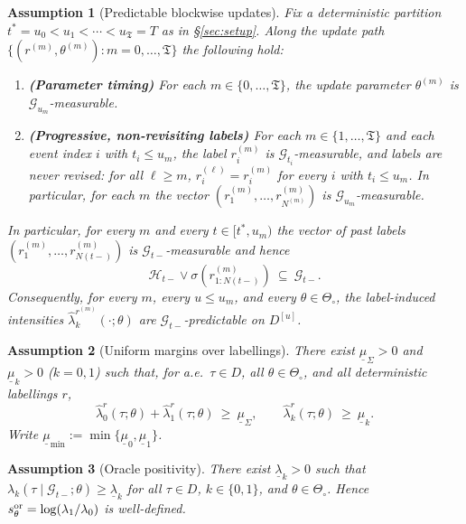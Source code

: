 \documentclass{statsoc}
\newtheorem{assumption}[assumption]{Assumption}
\newcommand{\1}{\mathbbm{1}}
\newcommand{\Tmax}{\mathfrak{T}}
\begin{document}
\begin{assumption}[Predictable blockwise updates]\label{ass:G0pred}
Fix a deterministic partition $t^\ast=u_0<u_1<\cdots<u_{\Tmax}=T$ as in \S\ref{sec:setup}.
Along the update path $\{(r^{(m)},\theta^{(m)}): m=0,\dots,\Tmax\}$ the following hold:

\begin{enumerate}[nosep,label=(\alph*)]
\item \textbf{(Parameter timing)} For each $m\in\{0,\dots,\Tmax\}$, the update parameter
$\theta^{(m)}$ is $\mathcal G_{u_m}$-measurable.

\item \textbf{(Progressive, non-revisiting labels)} For each $m\in\{1,\dots,\Tmax\}$ and each event index $i$ with
$t_i\le u_m$, the label $r_i^{(m)}$ is $\mathcal G_{t_i}$-measurable, and labels are never revised:
for all $\ell\ge m$, $r_i^{(\ell)}=r_i^{(m)}$ for every $i$ with $t_i\le u_m$.
In particular, for each $m$ the vector $(r_1^{(m)},\dots,r_{N^{(m)}}^{(m)})$ is $\mathcal G_{u_m}$-measurable.
\end{enumerate}

In particular, for every $m$ and every $t\in[t^\ast,u_m)$ the vector of past labels
$(r^{(m)}_1,\ldots,r^{(m)}_{N(t-)})$ is $\mathcal G_{t-}$-measurable and hence
\[
\mathcal H_{t-}\vee\sigma(r^{(m)}_{1:N(t-)})\ \subseteq\ \mathcal G_{t-}.
\]
Consequently, for every $m$, every $u\le u_m$, and every $\theta\in\Theta_\circ$,
the label-induced intensities $\widehat\lambda_k^{r^{(m)}}(\cdot;\theta)$ are $\mathcal G_{t-}$-predictable on $D^{[u]}$.
\end{assumption}

\begin{assumption}[Uniform margins over labellings]\label{ass:G1}
There exist $\underline\mu_\Sigma>0$ and $\underline\mu_k>0$ ($k=0,1$) such that, for a.e.\ $\tau\in D$, all $\theta\in\Theta_\circ$, and all deterministic labellings $r$,
\[
\widehat\lambda_0^r(\tau;\theta)+\widehat\lambda_1^r(\tau;\theta)\ \ge\ \underline\mu_\Sigma,\qquad
\widehat\lambda_k^r(\tau;\theta)\ \ge\ \underline\mu_k.
\]
Write $\underline\mu_{\min}:=\min\{\underline\mu_0,\underline\mu_1\}$.
\end{assumption}

\begin{assumption}[Oracle positivity]\label{ass:oracle-positivity}
There exist $\underline\lambda_k>0$ such that $\lambda_k(\tau\mid\mathcal G_{t-};\theta)\ge \underline\lambda_k$ for all $\tau\in D$, $k\in\{0,1\}$, and $\theta\in\Theta_\circ$. Hence $s_\theta^{\rm or}=\log(\lambda_1/\lambda_0)$ is well-defined.
\end{assumption}
\end{document}

